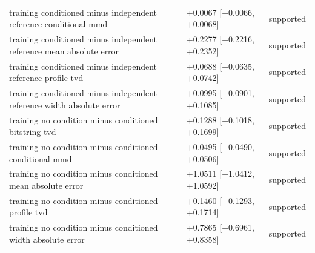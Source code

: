 \begin{table}[p]
\begin{tabular}{@{}p{}p{}p{}@{}}
training conditioned minus independent reference conditional mmd & +0.0067 [+0.0066, +0.0068] & supported \\
training conditioned minus independent reference mean absolute error & +0.2277 [+0.2216, +0.2352] & supported \\
training conditioned minus independent reference profile tvd & +0.0688 [+0.0635, +0.0742] & supported \\
training conditioned minus independent reference width absolute error & +0.0995 [+0.0901, +0.1085] & supported \\
training no condition minus conditioned bitstring tvd & +0.1288 [+0.1018, +0.1699] & supported \\
training no condition minus conditioned conditional mmd & +0.0495 [+0.0490, +0.0506] & supported \\
training no condition minus conditioned mean absolute error & +1.0511 [+1.0412, +1.0592] & supported \\
training no condition minus conditioned profile tvd & +0.1460 [+0.1293, +0.1714] & supported \\
training no condition minus conditioned width absolute error & +0.7865 [+0.6961, +0.8358] & supported \\
\bottomrule
\end{tabular}
\end{table}
\clearpage
